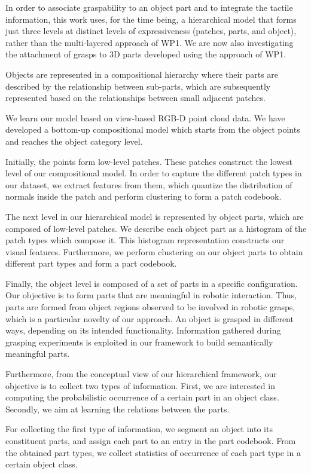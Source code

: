 \documentclass[a4paper,11pt,pdf]{pacmanreport}
\begin{document}
In order to associate graspability to an object part and to integrate the tactile information, this work uses, for the time being, a hierarchical model 
that forms just three levels at distinct levels of expressiveness (patches, 
parts, and object), rather than the multi-layered approach of WP1. We are now 
also investigating the attachment of grasps to 3D parts developed using the 
approach of WP1.

Objects are represented in a compositional hierarchy where their parts are described by the relationship between sub-parts, which are subsequently represented based on the relationships between small adjacent patches.

We learn our model based on view-based RGB-D point cloud data. We have developed a bottom-up compositional model which starts from the object points and reaches the object category level.

Initially, the points form low-level patches. These patches construct the lowest level of our compositional model. In order to capture the different patch types in our dataset, we extract features from them, which quantize the distribution of normals inside the patch and
perform clustering to form a patch codebook.

The next level in our hierarchical model is represented by object parts, which are composed of low-level patches. We describe each object part as a histogram of the patch types which compose it. This histogram representation constructs our visual features. Furthermore, we perform clustering on our object parts to obtain different part types and form a part codebook.

Finally, the object level is composed of a set of parts in a specific
configuration. Our objective is to form
parts that are meaningful in robotic interaction.  Thus, parts are
formed from object regions observed to be involved in robotic grasps,
which is a particular novelty of our approach. An object is grasped in
different ways, depending on its intended functionality.  Information
gathered during grasping experiments is exploited in our framework to build semantically meaningful parts.

Furthermore, from the conceptual view of our hierarchical framework, our objective is to collect two types of information. First, we are interested in computing the probabilistic occurrence of a certain part in an object class. Secondly, we aim at learning the relations between the parts.

For collecting the first type of information, we segment an object
into its constituent parts, and assign each part to an entry in the
part codebook. From the obtained part types, we collect statistics of
occurrence of each part type in a certain object class.
\end{document}

